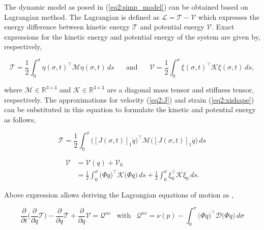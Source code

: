The dynamic model as posed in (\ref{eq2:simp_model}) can be obtained based on Lagrangian method. The Lagrangian is defined as $\mathcal{L} = \mathcal{T} -\mathcal{V}$ which expresses the energy difference between kinetic energy $\mathcal{T}$ and potential energy $\mathcal{V}$. Exact expressions for the kinetic energy and potential energy of the system are given by, respectively,

\begin{equation}
    \mathcal{T} = \frac{1}{2}\int_0^{\sigma} \eta(\sigma,t)^\top \mathcal{M} \eta(\sigma,t) \hspace{2pt} ds \hspace{20pt} \text{and} \hspace{20pt}  \mathcal{V} = \frac{1}{2}\int_0^{\sigma} \xi(\sigma,t)^\top \mathcal{K} \xi(\sigma,t)  \hspace{2pt} ds,
    \label{eq2:T}
\end{equation}


where $\mathcal{M} \in \mathbb{R}^{3\times3}$ and $\mathcal{K} \in \mathbb{R}^{3\times3}$ are a diagonal mass tensor and stiffness tensor, respectively. The approximations for velocity (\ref{eq2:J}) and strain (\ref{eq2:xishape}) can be substituted in this equation to formulate the kinetic and potential energy as follows,

\begin{equation}
    \mathcal{T} = \frac{1}{2}\int_0^{\sigma} \Big([J(\sigma,t)]_1\dot{q}\Big)^\top \mathcal{M} \Big([J(\sigma,t)]_1\dot{q}\Big) \hspace{2pt} ds
\end{equation}

\begin{equation}
\begin{split}
    \mathcal{V} &= \mathcal{V}(q) + \mathcal{V}_0  \\
                &=  \frac{1}{2}\int_0^{\sigma} \big(\Phi q\big)^\top \mathcal{K} \big(\Phi q\big) \hspace{2pt} ds +\frac{1}{2} \int_0^\sigma \xi_0^\top \mathcal{K} \xi_0  \hspace{2pt} ds .
\end{split}
\end{equation}

Above expression allows deriving the Lagrangian equations of motion as \cite{NWouw},

\begin{equation}
    \frac{\partial}{\partial t}\Big( \frac{\partial}{\partial\dot{q}}\mathcal{T}\Big)- \frac{\partial}{\partial q}\mathcal{T} + \frac{\partial}{\partial q}\mathcal{V} = \mathcal{Q}^{nc} \hspace{10pt} \text{with} \hspace{10pt} \mathcal{Q}^{nc} =  \nu(p) - \int_0^\sigma \big(\Phi\dot{q}\big)^\top \mathcal{D} \big( \Phi \dot{q}\big) \hspace{2pt} d \sigma
    \label{eq2:lagrange}
\end{equation}

